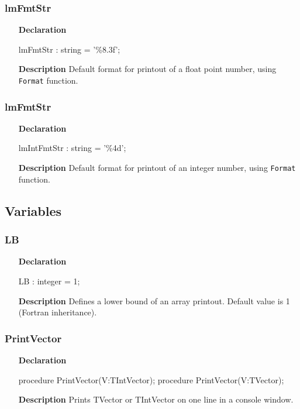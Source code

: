 \documentclass[12pt,a4paper,oneside]{report}
\newcommand{\declarationitem}[1]{\textbf{#1}}
\newcommand{\descriptiontitle}[1]{\textbf{#1}}
\newcommand{\code}[1]{\texttt{#1}}
\begin{document}
\subsubsection{lmFmtStr}
\label{uvecmatprn:lmFmtStr}
\begin{itemize}
	\item[\declarationitem{Declaration}\hfill]
	\begin{flushleft}
	lmFmtStr : string = '\%8.3f';
	\end{flushleft}
	\item[\descriptiontitle{Description}\hfill]
	Default format for printout of a float point number, using \code{Format} function.
\end{itemize}
\subsubsection{lmFmtStr}
\label{uvecmatprn:lmIntFmtStr}
\begin{itemize}
	\item[\declarationitem{Declaration}\hfill]
	\begin{flushleft}
		lmIntFmtStr : string = '\%4d';
	\end{flushleft}
	\item[\descriptiontitle{Description}\hfill]
	Default format for printout of an integer number, using \code{Format} function.
\end{itemize}
\subsection{Variables}
\subsubsection{LB}
\label{uvecmatprn:LB}
\begin{itemize}
	\item[\declarationitem{Declaration}\hfill]
	\begin{flushleft}
LB : integer = 1;
	\end{flushleft}
	\item[\descriptiontitle{Description}\hfill]
	Defines a lower bound of an array printout. Default value is 1 (Fortran inheritance).
\end{itemize}
\subsubsection{PrintVector}
\label{uvecmatprn:PrintVector}
\begin{itemize}
	\item[\declarationitem{Declaration}\hfill]
	\begin{flushleft}
	procedure PrintVector(V:TIntVector);
	procedure PrintVector(V:TVector);
	\end{flushleft}
	\item[\descriptiontitle{Description}\hfill]
	Prints TVector or TIntVector on one line in a console window.
\end{itemize}
\end{document}
